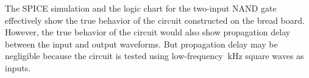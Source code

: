 
The SPICE simulation and the logic chart for the two-input NAND gate effectively show the true behavior of the circuit constructed on the bread board.
However, the true behavior of the circuit would also show propagation delay between the input and output waveforms.
But propagation delay may be negligible because the circuit is tested using low-frequency $~$\si{\kilo\hertz} square waves as inputs.
